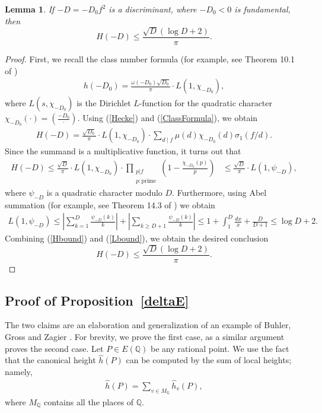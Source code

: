 \documentclass[12pt]{amsart}
\newtheorem{lemma}[theorem]{Lemma}
\newcommand{\Q}{\mathbb{Q}}
\newcommand{\leg}[2]{\genfrac{(}{)}{}{}{#1}{#2}}
\numberwithin{equation}{section}
\begin{document}
\begin{lemma}\label{LBound}
If $-D=-D_0f^2$ is a discriminant, where $-D_0<0$ is fundamental, then 
$$
H(-D)\leq\frac{\sqrt{D}(\log D+2)}{\pi}.
$$
\end{lemma}
\begin{proof} 
First, we recall the class number formula (for example, see Theorem 10.1 of \cite[p. 321]{Hua})
\begin{align}\label{ClassFormula}
h(-D_0)=\frac{\omega(-D_0)\sqrt{D_0}}{\pi}\cdot L(1,\chi_{-D_0}),
\end{align}
where $L(s,\chi_{-D_0})$ is the Dirichlet $L$-function for the quadratic character $\chi_{-D_0}(\cdot)=\leg{-D_0}{\cdot}$.
Using (\ref{Hecke}) and (\ref{ClassFormula}), we obtain 
\begin{align*}
    H(-D)=\frac{\sqrt{D_0}}{\pi}\cdot L(1,\chi_{-D_0})\cdot \sum_{d\mid f}\mu(d)\chi_{-D_0}(d)\sigma_1(f/d).
    \end{align*}
Since the summand is a multiplicative function, it turns out that
\begin{align}\label{Hbound}
    H(-D)\leq\frac{\sqrt{D}}{\pi}\cdot L(1,\chi_{-D_0})\cdot\prod_{\substack{p|f\\p:\mathrm{prime}}}\left(1-\frac{\chi_{-D_0}(p)}{p}\right)&\leq \frac{\sqrt{D}}{\pi}\cdot L(1,\psi_{-D}),
\end{align}
where $\psi_{-D}$ is a quadratic character modulo $D$.
Furthermore, using Abel summation (for example, see Theorem 14.3 of \cite[p. 330]{Hua}) we obtain
\begin{align}\label{Lbound}
    L(1,\psi_{-D})\leq \left|\sum_{k=1}^{D}\frac{\psi_{-D}(k)}{k}\right|+\left|\sum_{k\geq D+1}\frac{\psi_{-D}(k)}{k}\right|\leq 1+\int_{1}^{D}\frac{dx}{x} + \frac{D}{D+1}\leq \log D +2.
\end{align}
Combining (\ref{Hbound}) and (\ref{Lbound}), we obtain the desired conclusion
$$
H(-D)\leq \frac{\sqrt{D}(\log D+2)}{\pi}.
$$
\end{proof}


 
  
  \subsection{Proof of Proposition~\ref{deltaE}}
The two claims are an elaboration and generalization of an example of Buhler, Gross and Zagier \cite{BGZ}.  
For brevity, we prove the first case, as a similar argument proves the second case. 
Let $P\in E(\Q)$ be any rational point. We use the fact that the canonical height $\widehat{h}(P)$ can be computed by the sum of local heights; namely, 
\begin{align*}
    \widehat{h}(P)=\sum_{v\in{M_{\Q}}}\widehat{h}_{v}(P),
\end{align*}
where $M_{\Q}$ contains all the places of $\Q$. 
\end{document}
